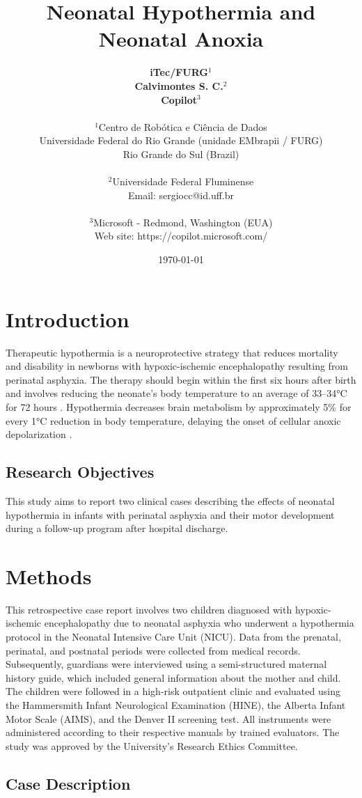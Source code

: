 \documentclass[11pt,a4paper]{article}
\title{\textbf{Neonatal Hypothermia and Neonatal Anoxia}}
\author{
	\textbf{iTec/FURG}$^{1}$ \\
	\textbf{Calvimontes S. C.}$^{2}$ \\
	\textbf{Copilot}$^{3}$ \\
	\\
	\small $^{1}$Centro de Robótica e Ciência de Dados \\
	\small Universidade Federal do Rio Grande (unidade EMbrapii / FURG) \\
	\small Rio Grande do Sul (Brazil) \\
	\\
	\small $^{2}$Universidade Federal Fluminense \\
	\small Email: sergiocc@id.uff.br \\
	\\
	\small $^{3}$Microsoft - Redmond, Washington (EUA) \\
	\small Web site: https://copilot.microsoft.com/
}
\date{\today}
\begin{document}
	
	\maketitle
	
	\newpage
	
	\section{Introduction}
	
	Therapeutic hypothermia is a neuroprotective strategy that reduces mortality and disability in newborns with hypoxic-ischemic encephalopathy resulting from perinatal asphyxia. The therapy should begin within the first six hours after birth and involves reducing the neonate’s body temperature to an average of 33–34°C for 72 hours \cite{Azzopardi2014,Thayyil2021,Abate2021}. Hypothermia decreases brain metabolism by approximately 5\% for every 1°C reduction in body temperature, delaying the onset of cellular anoxic depolarization \cite{Silveira2015}.
		
	\subsection{Research Objectives}
	This study aims to report two clinical cases describing the effects of neonatal hypothermia in infants with perinatal asphyxia and their motor development during a follow-up program after hospital discharge.
	
	\section{Methods}
	This retrospective case report involves two children diagnosed with hypoxic-ischemic encephalopathy due to neonatal asphyxia who underwent a hypothermia protocol in the Neonatal Intensive Care Unit (NICU). Data from the prenatal, perinatal, and postnatal periods were collected from medical records. Subsequently, guardians were interviewed using a semi-structured maternal history guide, which included general information about the mother and child. The children were followed in a high-risk outpatient clinic and evaluated using the Hammersmith Infant Neurological Examination (HINE), the Alberta Infant Motor Scale (AIMS), and the Denver II screening test. All instruments were administered according to their respective manuals by trained evaluators. The study was approved by the University's Research Ethics Committee.
	
	\subsection{Case Description}
\end{document}
